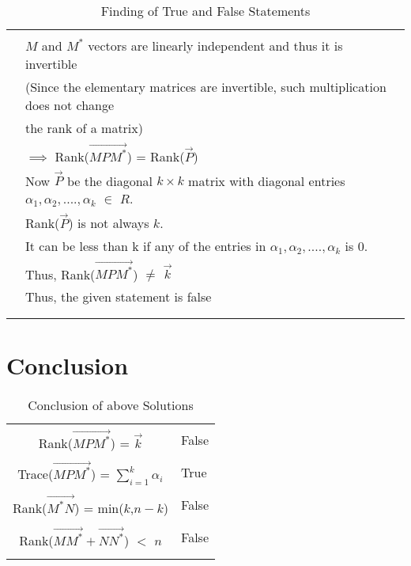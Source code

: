 \documentclass[journal,12pt]{IEEEtran}
\begin{document}
\begin{longtable}{|c|l|}
	& \\
	& $M$ and $M^*$ vectors are linearly independent and thus it is invertible\\
	& (Since the elementary matrices are invertible, such multiplication does not change\\
	& the rank of a matrix)\\
	& $\implies$ Rank($\vec{MP{M}^*}$) = Rank($\vec{P}$) \\
	& Now $\vec{P}$ be the diagonal $k \times k$ matrix with diagonal entries $\alpha_1,\alpha_2,....,\alpha_k$ $\in$ $R$.\\
	& Rank($\Vec{P}$) is not always $k$. \\
	& It can be less than k if any of the entries in $\alpha_1,\alpha_2,....,\alpha_k$ is 0.\\
	& Thus, Rank($\vec{MP{M}^*}$) $\ne$ $\vec{k}$\\
	& Thus, the given statement is false\\
	&\\
	\hline
	\caption{Finding of True and False Statements}
    \label{table:2}
\end{longtable}
\section{\textbf{Conclusion}}
\renewcommand{\thetable}{3}
\begin{longtable}{|c|l|}
    \hline
	\multirow{3}{*}{Rank($\vec{MP{M}^*}$) = $\vec{k}$} 
	& \\
	& False \\
	&\\
	\hline
	\multirow{3}{*}{{Trace($\vec{MP{M}^*}$) = $\sum_{i=1}^{k}\alpha_i$}} 
	& \\
	& True \\
	& \\
	\hline
	\multirow{3}{*}{Rank($\vec{{M}^*N}$) = min($k$,$n-k$)} 
	& \\
	& False \\
	& \\
	\hline
	\multirow{3}{*}{Rank($\vec{M{M}^*}+\vec{N{N}^*}$) $<$ $n$} 
	& \\
	& False \\
	& \\
	\hline
	\caption{Conclusion of above Solutions}
    \label{table:3}
\end{longtable}
\end{document}

